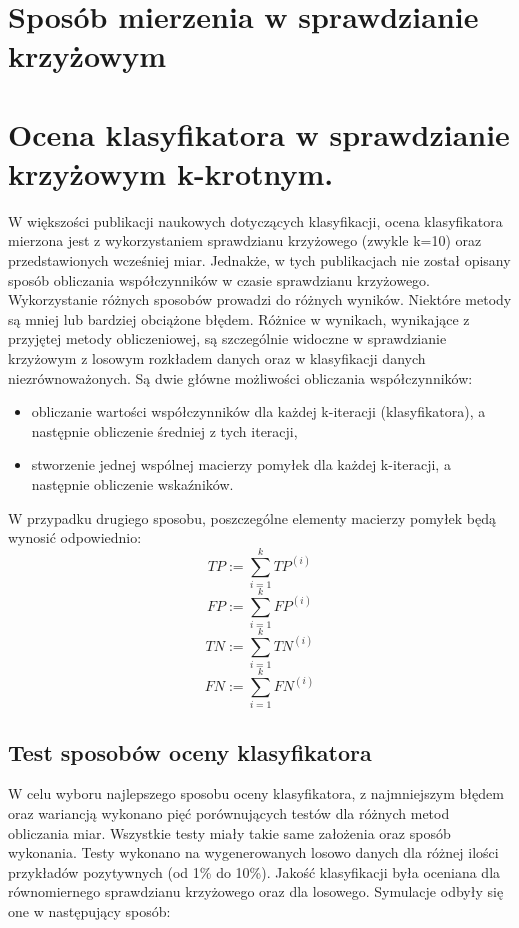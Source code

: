 \section{Sposób mierzenia w sprawdzianie krzyżowym}
\section{Ocena klasyfikatora w sprawdzianie krzyżowym k-krotnym.}
W większości publikacji naukowych dotyczących klasyfikacji, ocena klasyfikatora mierzona jest z wykorzystaniem sprawdzianu krzyżowego (zwykle k=10) oraz przedstawionych wcześniej miar. Jednakże, w tych publikacjach nie został opisany sposób obliczania współczynników w czasie sprawdzianu krzyżowego. Wykorzystanie różnych sposobów prowadzi do różnych wyników. Niektóre metody są mniej lub bardziej obciążone błędem. Różnice w wynikach, wynikające z przyjętej metody obliczeniowej, są szczególnie widoczne w sprawdzianie krzyżowym z losowym rozkładem danych oraz w klasyfikacji danych niezrównoważonych. Są dwie główne możliwości obliczania współczynników:
\begin{itemize}
	\item obliczanie wartości współczynników dla każdej k-iteracji (klasyfikatora), a następnie obliczenie średniej z tych iteracji,
	\item stworzenie jednej wspólnej macierzy pomyłek dla każdej k-iteracji, a następnie obliczenie wskaźników.
\end{itemize}
W przypadku drugiego sposobu, poszczególne elementy macierzy pomyłek będą wynosić odpowiednio:
\[TP := \sum_{i=1}^{k} TP^{(i)}\]
\[FP := \sum_{i=1}^{k} FP^{(i)}\]
\[TN := \sum_{i=1}^{k} TN^{(i)}\]
\[FN := \sum_{i=1}^{k} FN^{(i)}\]
\subsection{Test sposobów oceny klasyfikatora}
W celu wyboru najlepszego sposobu oceny klasyfikatora, z najmniejszym błędem oraz wariancją wykonano pięć porównujących testów dla różnych metod obliczania miar. Wszystkie testy miały takie same założenia oraz sposób wykonania. Testy wykonano na wygenerowanych losowo danych dla różnej ilości przykładów pozytywnych (od 1\% do 10\%). Jakość klasyfikacji była oceniana dla równomiernego sprawdzianu krzyżowego oraz dla losowego. Symulacje odbyły się one w następujący sposób:

